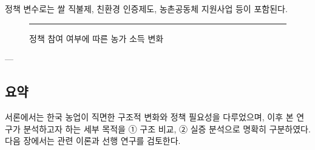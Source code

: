 정책 변수로는 쌀 직불제, 친환경 인증제도, 농촌공동체 지원사업 등이 포함된다.

\begin{figure}[htbp]
  \centering
  \rule{0.65\linewidth}{5cm}
  \caption{정책 참여 여부에 따른 농가 소득 변화}\label{fig:chapter1_3}
\end{figure}

---

\subsection{요약}

서론에서는 한국 농업이 직면한 구조적 변화와 정책 필요성을 다루었으며,  
이후 본 연구가 분석하고자 하는 세부 목적을 ① 구조 비교, ② 실증 분석으로 명확히 구분하였다.  
다음 장에서는 관련 이론과 선행 연구를 검토한다.
